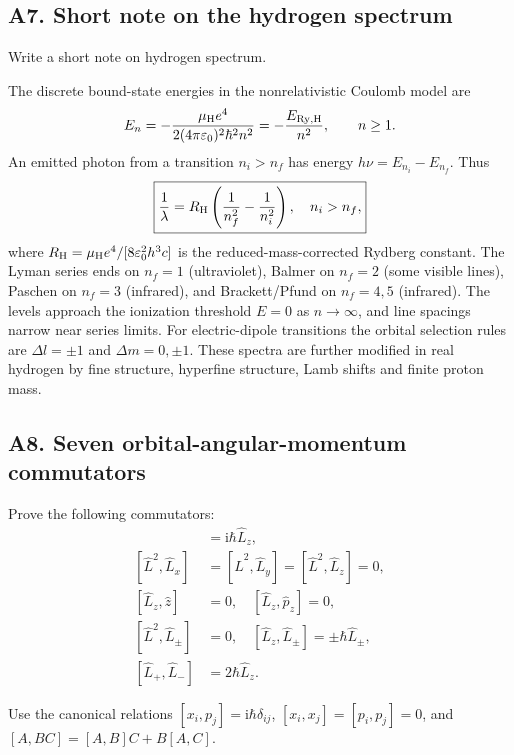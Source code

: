 \documentclass[11pt,a4paper]{article}
\newcommand{\iu}{\mathrm{i}}
\newcommand{\mH}{\mu_{\mathrm H}}
\newcommand{\eps}{\varepsilon_0}
\begin{document}
\subsection{A7. Short note on the hydrogen spectrum}
\begin{questionbox}Write a short note on hydrogen spectrum.\end{questionbox}
The discrete bound-state energies in the nonrelativistic Coulomb model are
\begin{equation}E_n=-\frac{\mH e^4}{2(4\pi\eps)^2\hbar^2n^2}=-\frac{E_{\rm Ry,H}}{n^2},\qquad n\ge1.\end{equation}
An emitted photon from a transition \(n_i>n_f\) has energy \(h\nu=E_{n_i}-E_{n_f}\). Thus
\begin{equation}\boxed{\frac1\lambda=R_{\rm H}\left(\frac1{n_f^2}-\frac1{n_i^2}\right),\quad n_i>n_f,}\end{equation}
where \(R_{\rm H}=\mu_{\rm H}e^4/[8\eps^2h^3c]\) is the reduced-mass-corrected Rydberg constant. The Lyman series ends on \(n_f=1\) (ultraviolet), Balmer on \(n_f=2\) (some visible lines), Paschen on \(n_f=3\) (infrared), and Brackett/Pfund on \(n_f=4,5\) (infrared). The levels approach the ionization threshold \(E=0\) as \(n\to\infty\), and line spacings narrow near series limits. For electric-dipole transitions the orbital selection rules are \(\Delta l=\pm1\) and \(\Delta m=0,\pm1\). These spectra are further modified in real hydrogen by fine structure, hyperfine structure, Lamb shifts and finite proton mass.

\subsection{A8. Seven orbital-angular-momentum commutators}
\begin{questionbox}
Prove the following commutators:
\begin{align*}
[\hat L_x,\hat L_y]&=\iu\hbar\hat L_z,\\
[\hat L^2,\hat L_x]&=[\hat L^2,\hat L_y]=[\hat L^2,\hat L_z]=0,\\
[\hat L_z,\hat z]&=0,\quad [\hat L_z,\hat p_z]=0,\\
[\hat L^2,\hat L_\pm]&=0,\quad [\hat L_z,\hat L_\pm]=\pm\hbar\hat L_\pm,\\
[\hat L_+,\hat L_-]&=2\hbar\hat L_z.
\end{align*}
\end{questionbox}
Use the canonical relations \([x_i,p_j]=\iu\hbar\delta_{ij}\), \([x_i,x_j]=[p_i,p_j]=0\), and \([A,BC]=[A,B]C+B[A,C]\).
\end{document}

